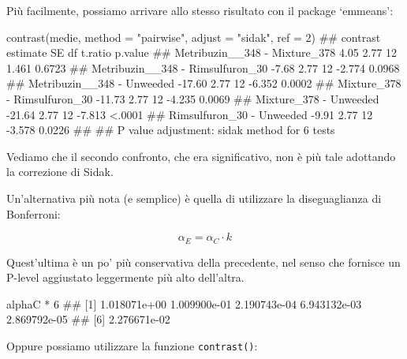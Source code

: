 \documentclass[a4paper,12pt,oneside]{book}
\newenvironment{Shaded}{\begin{snugshade}}{\end{snugshade}}
\newcommand{\DecValTok}[1]{#1}
\newcommand{\SpecialCharTok}[1]{#1}
\newcommand{\StringTok}[1]{#1}
\newcommand{\DocumentationTok}[1]{#1}
\newcommand{\FunctionTok}[1]{#1}
\newcommand{\AttributeTok}[1]{#1}
\newcommand{\NormalTok}[1]{#1}
\begin{document}
\normalsize

Più facilmente, possiamo arrivare allo stesso risultato con il package `emmeans':

\scriptsize

\begin{Shaded}
\begin{Highlighting}[]
\FunctionTok{contrast}\NormalTok{(medie, }\AttributeTok{method =} \StringTok{"pairwise"}\NormalTok{, }\AttributeTok{adjust =} \StringTok{"sidak"}\NormalTok{, }\AttributeTok{ref =} \DecValTok{2}\NormalTok{)}
\DocumentationTok{\#\#  contrast                         estimate   SE df t.ratio p.value}
\DocumentationTok{\#\#  Metribuzin\_\_348 {-} Mixture\_378        4.05 2.77 12   1.461  0.6723}
\DocumentationTok{\#\#  Metribuzin\_\_348 {-} Rimsulfuron\_30    {-}7.68 2.77 12  {-}2.774  0.0968}
\DocumentationTok{\#\#  Metribuzin\_\_348 {-} Unweeded         {-}17.60 2.77 12  {-}6.352  0.0002}
\DocumentationTok{\#\#  Mixture\_378 {-} Rimsulfuron\_30       {-}11.73 2.77 12  {-}4.235  0.0069}
\DocumentationTok{\#\#  Mixture\_378 {-} Unweeded             {-}21.64 2.77 12  {-}7.813  \textless{}.0001}
\DocumentationTok{\#\#  Rimsulfuron\_30 {-} Unweeded           {-}9.91 2.77 12  {-}3.578  0.0226}
\DocumentationTok{\#\# }
\DocumentationTok{\#\# P value adjustment: sidak method for 6 tests}
\end{Highlighting}
\end{Shaded}

\normalsize

Vediamo che il secondo confronto, che era significativo, non è più tale adottando la correzione di Sidak.

Un'alternativa più nota (e semplice) è quella di utilizzare la diseguaglianza di Bonferroni:

\[\alpha_E = \alpha_C \cdot k\]

Quest'ultima è un po' più conservativa della precedente, nel senso che fornisce un P-level aggiustato leggermente più alto dell'altra.

\begin{Shaded}
\begin{Highlighting}[]
\NormalTok{alphaC }\SpecialCharTok{*} \DecValTok{6}
\DocumentationTok{\#\# [1] 1.018071e+00 1.009900e{-}01 2.190743e{-}04 6.943132e{-}03 2.869792e{-}05}
\DocumentationTok{\#\# [6] 2.276671e{-}02}
\end{Highlighting}
\end{Shaded}

Oppure possiamo utilizzare la funzione \texttt{contrast()}:
\end{document}
